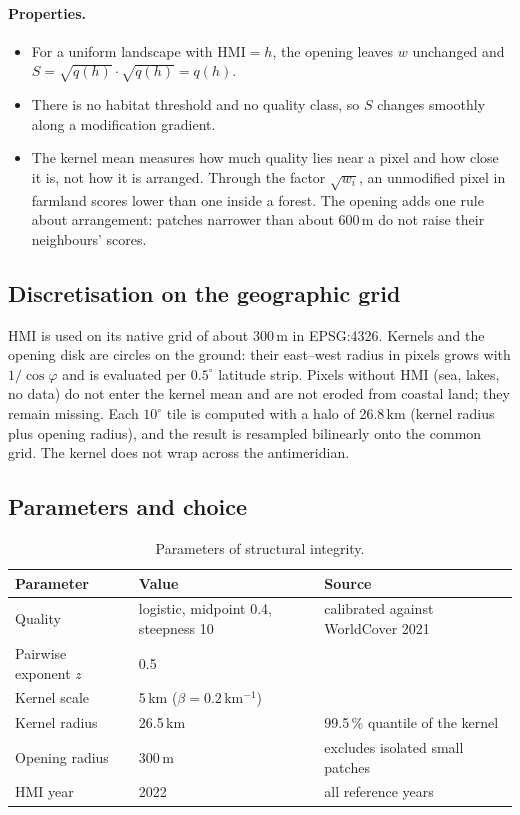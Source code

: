 \documentclass[11pt,a4paper]{article}
\newcommand{\HMI}{\mathrm{HMI}}
\begin{document}
\paragraph{Properties.}
\begin{itemize}
\item For a uniform landscape with $\HMI = h$, the opening leaves $w$ unchanged and
$S = \sqrt{q(h)}\cdot\sqrt{q(h)} = q(h)$.
\item There is no habitat threshold and no quality class, so $S$ changes smoothly along a
modification gradient.
\item The kernel mean measures how much quality lies near a pixel and how close it is, not how
it is arranged. Through the factor $\sqrt{w_i}$, an unmodified pixel in farmland scores lower
than one inside a forest. The opening adds one rule about arrangement: patches narrower than
about 600\,m do not raise their neighbours' scores.
\end{itemize}

\subsection{Discretisation on the geographic grid}

HMI is used on its native grid of about 300\,m in EPSG:4326. Kernels and the opening disk are
circles on the ground: their east--west radius in pixels grows with $1/\cos\varphi$ and is
evaluated per $0.5^\circ$ latitude strip. Pixels without HMI (sea, lakes, no data) do not enter
the kernel mean and are not eroded from coastal land; they remain missing. Each $10^\circ$ tile is
computed with a halo of 26.8\,km (kernel radius plus opening radius), and the result is resampled
bilinearly onto the common grid. The kernel does not wrap across the antimeridian.

\subsection{Parameters and choice}

\begin{table}[H]
\centering\small
\caption{Parameters of structural integrity.}
\begin{tabular}{lll}
\toprule
Parameter & Value & Source \\
\midrule
Quality & logistic, midpoint 0.4, steepness 10 & calibrated against WorldCover 2021 \\
Pairwise exponent $z$ & 0.5 & \citet{beyer2020} \\
Kernel scale & 5\,km ($\beta = 0.2$\,km$^{-1}$) & \citet{beyer2020} \\
Kernel radius & 26.5\,km & 99.5\,\% quantile of the kernel \\
Opening radius & 300\,m & excludes isolated small patches \\
HMI year & 2022 & all reference years \\
\bottomrule
\end{tabular}
\end{table}
\end{document}
